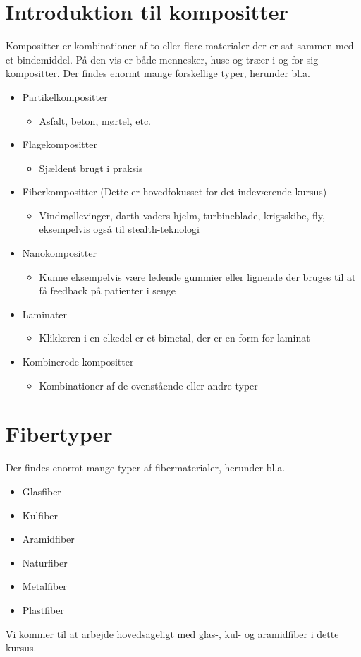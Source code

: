 

\section{Introduktion til kompositter}
Kompositter er kombinationer af to eller flere materialer der er sat sammen med et bindemiddel.
På den vis er både mennesker, huse og træer i og for sig kompositter.
Der findes enormt mange forskellige typer, herunder bl.a.
\begin{itemize}
  \item Partikelkompositter
  \begin{itemize}
    \item Asfalt, beton, mørtel, etc.
  \end{itemize}
  \item Flagekompositter
  \begin{itemize}
    \item Sjældent brugt i praksis
  \end{itemize}
  \item Fiberkompositter (Dette er hovedfokusset for det indeværende kursus)
  \begin{itemize}
    \item Vindmøllevinger, darth-vaders hjelm, turbineblade, krigsskibe, fly, eksempelvis også til stealth-teknologi
  \end{itemize}
  \item Nanokompositter
  \begin{itemize}
    \item Kunne eksempelvis være ledende gummier eller lignende der bruges til at få feedback på patienter i senge
  \end{itemize}
  \item Laminater
  \begin{itemize}
    \item Klikkeren i en elkedel er et bimetal, der er en form for laminat
  \end{itemize}
  \item Kombinerede kompositter
  \begin{itemize}
    \item Kombinationer af de ovenstående eller andre typer
  \end{itemize}
\end{itemize}

\section{Fibertyper}
Der findes enormt mange typer af fibermaterialer, herunder bl.a.
\begin{itemize}
  \item Glasfiber
  \item Kulfiber
  \item Aramidfiber
  \item Naturfiber
  \item Metalfiber
  \item Plastfiber
\end{itemize}
Vi kommer til at arbejde hovedsageligt med glas-, kul- og aramidfiber i dette kursus. 

